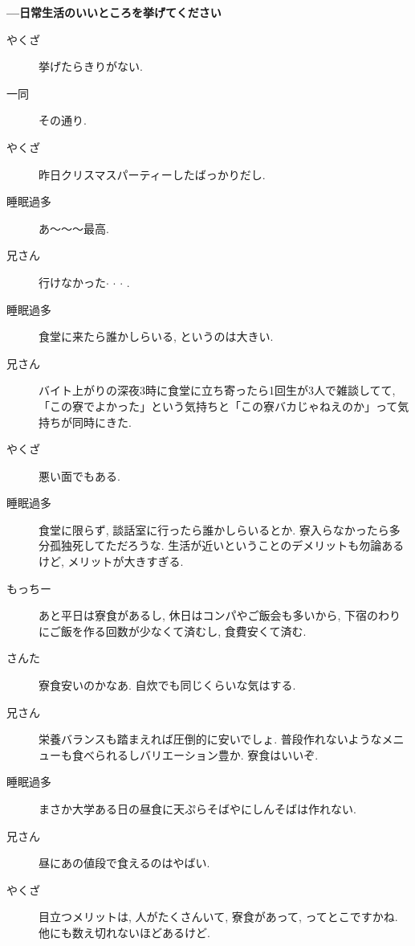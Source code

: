 \documentclass[10pt,b5jsbook,dvips,dvipdfmx,openany]{jsbook}
\theoremstyle{definition}
\begin{document}
\begin{multicols}{2}
		\textbf{---日常生活のいいところを挙げてください}
		\begin{description}
		\item[やくざ]挙げたらきりがない. 
		\item[ 一同 ]その通り. 
		\item[やくざ]昨日クリスマスパーティーしたばっかりだし. 
		\item[睡眠過多]あ〜〜〜最高. 
		\item[兄さん]行けなかった$ \cdot $ $ \cdot $ $ \cdot $ . 
		\item[睡眠過多]食堂に来たら誰かしらいる, というのは大きい. 
		\item[兄さん]バイト上がりの深夜3時に食堂に立ち寄ったら1回生が3人で雑談してて, 「この寮でよかった」という気持ちと「この寮バカじゃねえのか」って気持ちが同時にきた. 
		\item[やくざ]悪い面でもある. 
		\item[睡眠過多]食堂に限らず, 談話室に行ったら誰かしらいるとか. 寮入らなかったら多分孤独死してただろうな. 生活が近いということのデメリットも勿論あるけど, メリットが大きすぎる. 
		\item[もっちー]あと平日は寮食があるし, 休日はコンパやご飯会も多いから, 下宿のわりにご飯を作る回数が少なくて済むし, 食費安くて済む. 
		\item[さんた]寮食安いのかなあ. 自炊でも同じくらいな気はする. 
		\item[兄さん]栄養バランスも踏まえれば圧倒的に安いでしょ. 普段作れないようなメニューも食べられるしバリエーション豊か. 寮食はいいぞ. 
		\item[睡眠過多]まさか大学ある日の昼食に天ぷらそばやにしんそばは作れない. 
		\item[兄さん]昼にあの値段で食えるのはやばい. 
		\item[やくざ]目立つメリットは, 人がたくさんいて, 寮食があって, ってとこですかね. 他にも数え切れないほどあるけど. 
		\end{description}


\end{multicols}
\end{document}
